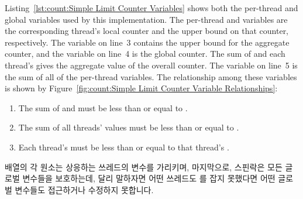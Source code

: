 Listing~\ref{lst:count:Simple Limit Counter Variables}
shows both the per-thread and global variables used by this
implementation.
The per-thread  and  variables are the
corresponding thread's local counter and the upper bound on that
counter, respectively.
The  variable on line~3 contains the upper
bound for the aggregate counter, and the  variable
on line~4 is the global counter.
The sum of  and each thread's  gives
the aggregate value of the overall counter.
The  variable on line~5 is the sum of all of the
per-thread  variables.
The relationship among these variables is shown by
Figure~\ref{fig:count:Simple Limit Counter Variable Relationships}:
\begin{enumerate}
\item	The sum of  and  must
	be less than or equal to .
\item	The sum of all threads'  values must be
	less than or equal to .
\item	Each thread's  must be less than or equal to
	that thread's .
\end{enumerate}
\fi

 배열의 각 원소는 상응하는 쓰레드의  변수를
가리키며, 마지막으로,  스핀락은 모든 글로벌 변수들을
보호하는데, 달리 말하자면 어떤 쓰레드도  를 잡지 못했다면 어떤
글로벌 변수들도 접근하거나 수정하지 못합니다.

